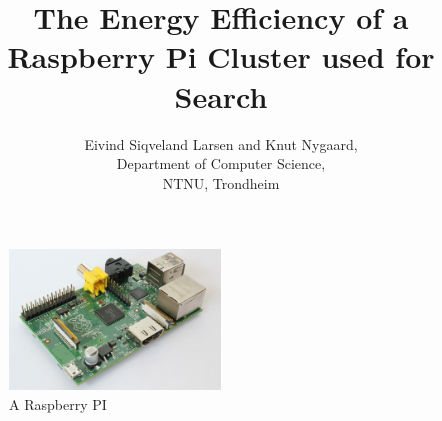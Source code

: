 \documentclass[a4paper, 12pt]{article}
\title{The Energy Efficiency of a Raspberry Pi Cluster used for Search}
\author{Eivind Siqveland Larsen and Knut Nygaard,\\
        Department of Computer Science,\\
        NTNU,
        Trondheim}
\begin{document}
\maketitle



\begin{figure}[h]
    \centering
    \includegraphics[width=0.5\textwidth]{hardware/RaspberryPi}
    \caption{A Raspberry PI}
    \label{fig:raspberrypi_hw}
\end{figure}

\clearpage
\tableofcontents













\clearpage


\end{document}

